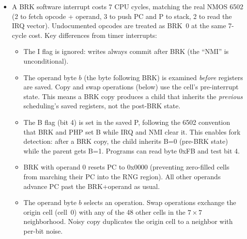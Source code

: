 \documentclass{article}
\begin{document}
\begin{itemize}
  A timer interrupt is handled as follows:
\begin{itemize}
\item If the interrupt disable flag (I) is set, all writes made since the last interrupt are reverted (atomic abort). Otherwise:
\item The B flag (bit 4) is cleared in P.
\item CPU registers are written to the last seven bytes of zero page (0xF9--0xFF).
\item The memory-mapped neighborhood is copied from RAM to storage (un-rotating oriented registers at 0xF0--0xF9).
\item A new origin cell $(i,j)$ and orientation is randomly sampled. The memory-mapped neighborhood of that cell is loaded from storage to RAM.
\item The last four bytes of zero page are overwritten with pseudorandom numbers.
\item Optional (via the \texttt{hasCompass} hyperparameter): the scheduler writes the current orientation vector (left-shifted by two bits) to 0xFA, so programs can detect their orientation and adjust their behavior accordingly. If \texttt{hasCompass} is disabled, the scheduler writes zero to 0xFA instead.
\item CPU registers are restored from the last seven bytes of zero page (prior to their being overwritten).
\end{itemize}
\item A BRK software interrupt costs 7 CPU cycles, matching the real NMOS 6502
  (2 to fetch opcode + operand, 3 to push PC and P to stack, 2 to read the
  IRQ vector). Undocumented opcodes are treated as BRK~0 at the same 7-cycle
  cost. Key differences from timer interrupts:
  \begin{itemize}
    \item The I flag is ignored: writes always commit after BRK (the ``NMI'' is unconditional).
    \item The operand byte $b$ (the byte following BRK) is examined \emph{before} registers are saved. Copy and swap operations (below) use the cell's pre-interrupt state. This means a BRK copy produces a child that inherits the \emph{previous} scheduling's saved registers, not the post-BRK state.
    \item The B flag (bit 4) is set in the saved P, following the 6502 convention that BRK and PHP set B while IRQ and NMI clear it. This enables fork detection: after a BRK copy, the child inherits B=0 (pre-BRK state) while the parent gets B=1. Programs can read byte 0xFB and test bit 4.
    \item BRK with operand 0 resets PC to 0x0000 (preventing zero-filled cells from marching their PC into the RNG region). All other operands advance PC past the BRK+operand as usual.
    \item The operand byte $b$ selects an operation.
      Swap operations exchange the origin cell (cell~0) with any of the 48 other
      cells in the $7 \times 7$ neighborhood.
      Noisy copy duplicates the origin cell to a neighbor with per-bit noise.


\end{itemize}
\end{itemize}
\end{document}
